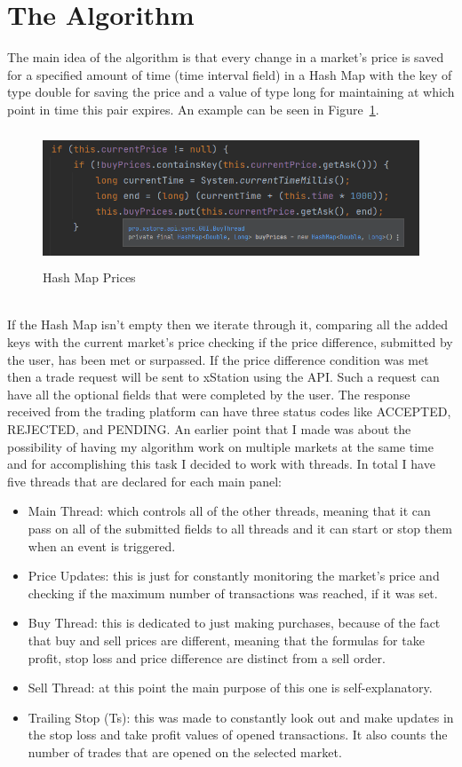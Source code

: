 \documentclass[12pt,a4paper]{report}
\begin{document}
\section{The Algorithm}
The main idea of the algorithm is that every change in a market's price is saved for a specified amount of time (time interval field) in a Hash Map with the key of type double for saving the price and a value of type long for maintaining at which point in time this pair expires. An example can be seen in Figure~\ref{fig:prices}.
\begin{figure}[!ht]
	\centering
	\includegraphics[width=13cm,height=4cm]{pics/prices.png}
	\caption{Hash Map Prices}
	\label{fig:prices}
\end{figure}
\\
If the Hash Map isn't empty then we iterate through it, comparing all the added keys with the current market's price checking if the price difference, submitted by the user, has been met or surpassed. If the price difference condition was met then a trade request will be sent to xStation using the API. Such a request can have all the optional fields that were completed by the user. The response received from the trading platform can have three status codes like ACCEPTED, REJECTED, and PENDING. An earlier point that I made was about the possibility of having my algorithm work on multiple markets at the same time and for accomplishing this task I decided to work with threads. In total I have five threads that are declared for each main panel:
\begin{itemize}
	\item Main Thread: which controls all of the other threads, meaning that it can pass on all of the submitted fields to all threads and it can start or stop them when an event is triggered. 
	\item Price Updates: this is just for constantly monitoring the market's price and checking if the maximum number of transactions was reached, if it was set.
	\item Buy Thread: this is dedicated to just making purchases, because of the fact that buy and sell prices are different, meaning that the formulas for take profit, stop loss and price difference are distinct from a sell order.
	\item Sell Thread: at this point the main purpose of this one is self-explanatory.
	\item Trailing Stop (Ts): this was made to constantly look out and make updates in the stop loss and take profit values of opened transactions. It also counts the number of trades that are opened on the selected market.   
\end{itemize}
\end{document}
